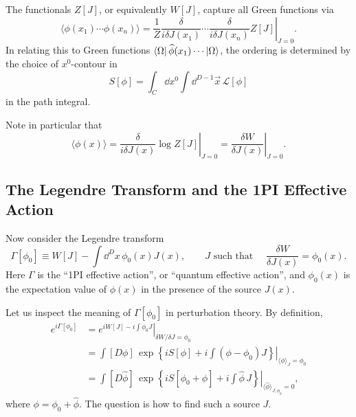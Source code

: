 The functionals \(Z[J]\), or equivalently \(W[J]\), capture all Green
functions via
\[
  \langle \phi(x_1)\cdots\phi(x_n)\rangle
  =
  \left.
  \frac1Z
  \frac{\delta}{i\delta J(x_1)}\cdots
  \frac{\delta}{i\delta J(x_n)}
  Z[J]
  \right|_{J=0}.
\]
In relating this to Green functions
\(\bra{\Omega}\widehat\phi(x_1)\cdots\ket{\Omega}\), the ordering is
determined by the choice of \(x^0\)-contour in
\[
  S[\phi]
  =
  \int_C\dd x^0\int\dd^{D-1}\vec x\,\mathcal L[\phi]
\]
in the path integral.

Note in particular that
\[
  \langle\phi(x)\rangle
  =
  \left.
  \frac{\delta}{i\delta J(x)}\log Z[J]
  \right|_{J=0}
  =
  \left.
  \frac{\delta W}{\delta J(x)}
  \right|_{J=0}.
\]

\subsection{The Legendre Transform and the 1PI Effective Action}

Now consider the Legendre transform
\[
  \Gamma[\phi_0]
  \equiv
  W[J]-\int\dd^Dx\,\phi_0(x)J(x),
  \qquad
  J \text{ such that }\quad
  \frac{\delta W}{\delta J(x)}=\phi_0(x).
\]
Here \(\Gamma\) is the ``1PI effective action'', or ``quantum effective
action'', and \(\phi_0(x)\) is the expectation value of \(\phi(x)\) in the
presence of the source \(J(x)\).

Let us inspect the meaning of \(\Gamma[\phi_0]\) in perturbation theory.
By definition,
\[
\begin{aligned}
  e^{i\Gamma[\phi_0]}
  &=
  \left.
  e^{iW[J]-i\int\phi_0J}
  \right|_{\delta W/\delta J=\phi_0}
\\
  &=
  \left.
  \int[D\phi]\,
  \exp\left\{
    iS[\phi]+i\int(\phi-\phi_0)J
  \right\}
  \right|_{\langle\phi\rangle_J=\phi_0}
\\
  &=
  \left.
  \int[D\widehat\phi]\,
  \exp\left\{
    iS[\phi_0+\widehat\phi]+i\int\widehat\phi\,J
  \right\}
  \right|_{\langle\widehat\phi\rangle_{J,\phi_0}=0},
\end{aligned}
\]
where \(\phi=\phi_0+\widehat\phi\).  The question is how to find such a
source \(J\).

